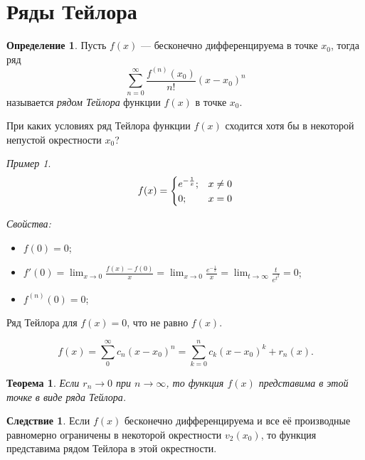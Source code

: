\documentclass[a4paper,12pt]{article}
\newtheorem*{theorem}{Теорема}
\theoremstyle{remark}
\newtheorem*{example}{Пример}
\theoremstyle{definition}
\newtheorem{definition}{Определение}
\newtheorem*{effect}{Следствие}
\begin{document}
\section*{Ряды Тейлора}

\begin{definition}
    Пусть \(f(x)\) --- бесконечно дифференцируема в точке \(x_0\), тогда ряд
    \begin{equation*}
        \sum_{n = 0}^\infty \frac{f^{(n)}(x_0)}{n!}(x - x_0)^n
    \end{equation*}
    называется \emph{рядом Тейлора} функции \(f(x)\) в точке \(x_0\).
\end{definition}

При каких условиях ряд Тейлора функции \(f(x)\) сходится хотя бы в некоторой непустой окрестности \(x_0\)?

\begin{example}
    \begin{equation*}
        f(x) = 
        \begin{dcases}
            e^{-\frac{1}{x}}; & x \neq 0\\
            0; & x = 0
        \end{dcases}
    \end{equation*}

    \emph{Свойства:}
    \begin{itemize}
        \item \(f(0) = 0\);
        \item \(f'(0) = \lim_{x \rightarrow 0} \frac{f(x) - f(0)}{x} = \lim_{x \rightarrow 0} \frac{e^{-\frac{1}{x}}}{x} = \lim_{t \rightarrow \infty} \frac{t}{e^{t^2}} = 0\);
        \item \(f^{(n)}(0) = 0\);
    \end{itemize}

    Ряд Тейлора для \(f(x) = 0\), что не равно \(f(x)\).
\end{example}

\begin{equation*}
    f(x) = \sum_0^\infty c_n(x - x_0)^n  = \sum_{k = 0}^n c_k(x - x_0)^k + r_n(x).
\end{equation*}

\begin{theorem}
    Если \(r_n \rightarrow 0\) при \(n \rightarrow \infty\), то функция \(f(x)\) представима в этой точке в виде ряда Тейлора.
\end{theorem}

\begin{effect}
    Если \(f(x)\) бесконечно дифференцируема и все её производные равномерно ограничены в некоторой окрестности \(v_2(x_0)\), то функция представима рядом Тейлора в этой окрестности.
\end{effect}
\end{document}
